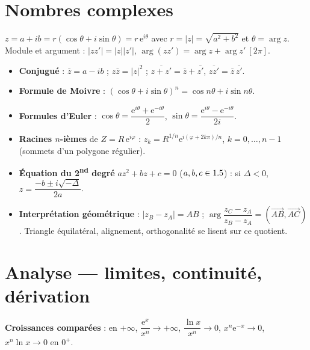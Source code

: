 \section{Nombres complexes}

\begin{aretenir}
$z=a+ib=r(\cos\theta+i\sin\theta)=r\,\mathrm{e}^{i\theta}$ avec $r=|z|=\sqrt{a^2+b^2}$ et
$\theta=\arg z$. Module et argument : $|zz'|=|z||z'|$, $\arg(zz')=\arg z+\arg z'\ [2\pi]$.
\end{aretenir}

\begin{itemize}
\item \textbf{Conjugué} : $\bar z=a-ib$ ; $z\bar z=|z|^2$ ; $\overline{z+z'}=\bar z+\bar{z'}$, $\overline{zz'}=\bar z\,\bar{z'}$.
\item \textbf{Formule de Moivre} : $(\cos\theta+i\sin\theta)^n=\cos n\theta+i\sin n\theta$.
\item \textbf{Formules d'Euler} : $\cos\theta=\dfrac{\mathrm{e}^{i\theta}+\mathrm{e}^{-i\theta}}2$, $\sin\theta=\dfrac{\mathrm{e}^{i\theta}-\mathrm{e}^{-i\theta}}{2i}$.
\item \textbf{Racines $n$-ièmes} de $Z=R\,\mathrm{e}^{i\varphi}$ : $z_k=R^{1/n}\mathrm{e}^{i(\varphi+2k\pi)/n}$, $k=0,\dots,n-1$ (sommets d'un polygone régulier).
\item \textbf{Équation du 2\textsuperscript{nd} degré} $az^2+bz+c=0$ ($a,b,c\in1.5$) : si $\Delta<0$, $z=\dfrac{-b\pm i\sqrt{-\Delta}}{2a}$.
\item \textbf{Interprétation géométrique} : $|z_B-z_A|=AB$ ; $\arg\dfrac{z_C-z_A}{z_B-z_A}=(\vec{AB},\vec{AC})$.
      Triangle équilatéral, alignement, orthogonalité se lisent sur ce quotient.
\end{itemize}

\section{Analyse — limites, continuité, dérivation}

\begin{aretenir}
\textbf{Croissances comparées} : en $+\infty$, $\dfrac{\mathrm{e}^x}{x^n}\to+\infty$,
$\dfrac{\ln x}{x^n}\to0$, $x^n\mathrm{e}^{-x}\to0$, $x^n\ln x\to0$ en $0^+$.
\end{aretenir}

